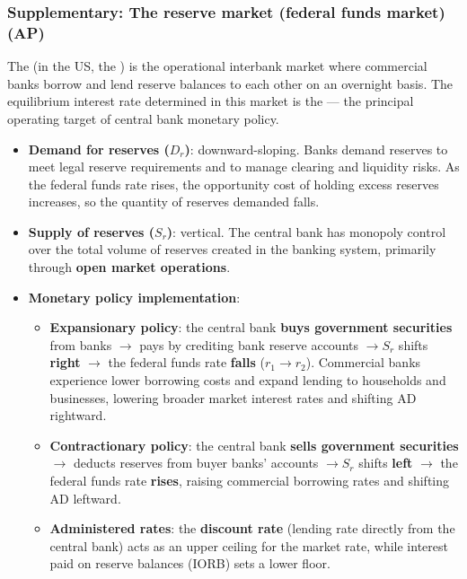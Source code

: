 \subsubsection*{Supplementary: The reserve market (federal funds market) (AP)}
The  (in the US, the ) is the operational interbank market where commercial banks borrow and lend reserve balances to each other on an overnight basis. The equilibrium interest rate determined in this market is the  --- the principal operating target of central bank monetary policy.
\begin{itemize}
  \item \textbf{Demand for reserves ($D_r$)}: downward-sloping. Banks demand reserves to meet legal reserve requirements and to manage clearing and liquidity risks. As the federal funds rate rises, the opportunity cost of holding excess reserves increases, so the quantity of reserves demanded falls.
  \item \textbf{Supply of reserves ($S_r$)}: vertical. The central bank has monopoly control over the total volume of reserves created in the banking system, primarily through \textbf{open market operations}.
  \item \textbf{Monetary policy implementation}:
  \begin{itemize}
    \item \textbf{Expansionary policy}: the central bank \textbf{buys government securities} from banks $\to$ pays by crediting bank reserve accounts $\to S_r$ shifts \textbf{right} $\to$ the federal funds rate \textbf{falls} ($r_1 \to r_2$). Commercial banks experience lower borrowing costs and expand lending to households and businesses, lowering broader market interest rates and shifting AD rightward.
    \item \textbf{Contractionary policy}: the central bank \textbf{sells government securities} $\to$ deducts reserves from buyer banks' accounts $\to S_r$ shifts \textbf{left} $\to$ the federal funds rate \textbf{rises}, raising commercial borrowing rates and shifting AD leftward.
    \item \textbf{Administered rates}: the \textbf{discount rate} (lending rate directly from the central bank) acts as an upper ceiling for the market rate, while interest paid on reserve balances (IORB) sets a lower floor.
  \end{itemize}
\end{itemize}
